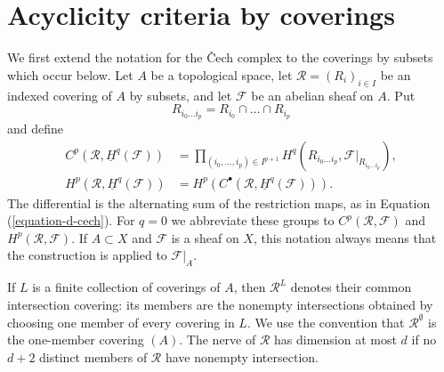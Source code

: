\section{Acyclicity criteria by coverings}
\label{section-covering-acyclicity-criteria}

\noindent
We first extend the notation for the \v Cech complex to the coverings by
subsets which occur below. Let $A$ be a topological space, let
$\mathcal R=(R_i)_{i\in I}$ be an indexed covering of $A$ by subsets, and
let $\mathcal F$ be an abelian sheaf on $A$. Put
$$
R_{i_0\ldots i_p}=R_{i_0}\cap\ldots\cap R_{i_p}
$$
and define
\begin{align*}
C^p(\mathcal R,\underline H^q(\mathcal F))
&=
\prod_{(i_0,\ldots,i_p)\in I^{p+1}}
H^q(R_{i_0\ldots i_p},
\mathcal F|_{R_{i_0\ldots i_p}}),\\
H^p(\mathcal R,\underline H^q(\mathcal F))
&=
H^p(C^\bullet(\mathcal R,\underline H^q(\mathcal F))).
\end{align*}
The differential is the alternating sum of the restriction maps, as in
Equation (\ref{equation-d-cech}). For $q=0$ we abbreviate these groups to
$C^p(\mathcal R,\mathcal F)$ and $H^p(\mathcal R,\mathcal F)$.
If $A\subset X$ and $\mathcal F$ is a sheaf on $X$, this notation always
means that the construction is applied to $\mathcal F|_A$.

If $L$ is a finite collection of coverings of $A$, then
$\mathcal R^L$ denotes their common intersection covering: its members are
the nonempty intersections obtained by choosing one member of every
covering in $L$. We use the convention that $\mathcal R^\emptyset$ is the
one-member covering $(A)$. The nerve of $\mathcal R$ has dimension at most
$d$ if no $d+2$ distinct members of $\mathcal R$ have nonempty
intersection.

